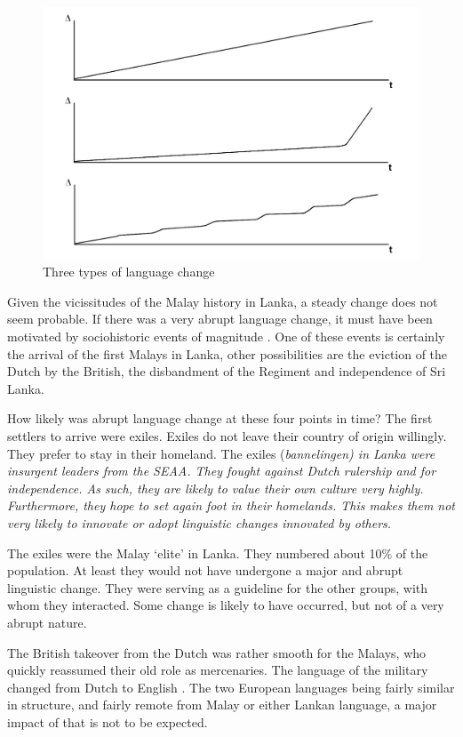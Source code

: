 \begin{figure}
    \centering
        \includegraphics{pics/lgchggrph}
    \caption{Three types of language change}
    \label{fig:lgchangegraph}
\end{figure}

Given the vicissitudes of the Malay history in Lanka, a steady change does not seem probable.
If there was a very abrupt language change, it must have been motivated by sociohistoric events of magnitude \citep{abc} . One of these events is certainly the arrival of the first Malays in Lanka, other possibilities are the eviction of the Dutch by the British, the disbandment of the Regiment and independence of Sri Lanka\kuckn.

How likely was abrupt language change at these four points in time? The first settlers to arrive were exiles. Exiles do not leave their country of origin willingly. They prefer to stay in their homeland. The exiles (\em bannelingen\em) in Lanka were insurgent leaders from the SEAA. They fought against Dutch rulership and for independence. As such, they are likely to value their own culture very highly. Furthermore, they hope to set again foot in their homelands. This makes them not very likely to innovate or adopt linguistic changes innovated by others.

The exiles were the Malay `elite' in Lanka. They numbered about
10\% of the population. At least they would not have undergone a
major and abrupt linguistic change. They were serving as a
guideline for the other groups, with whom they interacted. Some
change is likely to have occurred, but not of a very abrupt
nature.

The British takeover from the Dutch was rather smooth for the Malays, who quickly reassumed their old role as mercenaries. The language of the military changed from Dutch to English . The two European languages being fairly similar in structure, and fairly remote from Malay or either Lankan language, a major impact of that is not to be expected.

